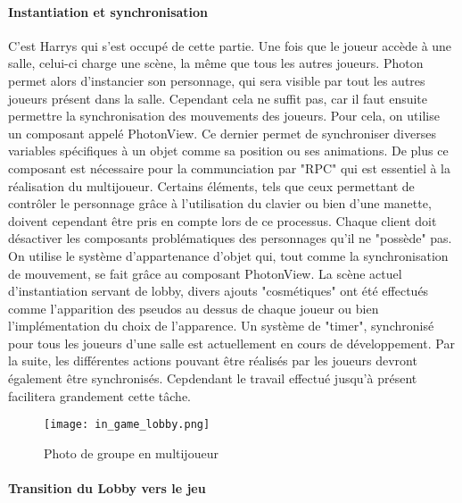         \paragraph{Instantiation et synchronisation}
            C'est Harrys qui s'est occupé de cette partie. Une fois que le joueur accède à une salle,
            celui-ci charge une scène, la même que tous les autres joueurs.
            Photon permet alors d'instancier son personnage, qui sera visible par tout les autres joueurs
            présent dans la salle. Cependant cela ne suffit pas, car il faut ensuite permettre la synchronisation
            des mouvements des joueurs. Pour cela, on utilise un composant appelé PhotonView. Ce dernier permet de
            synchroniser diverses variables spécifiques à un objet comme sa position ou ses animations. 
            De plus ce composant est nécessaire pour la communciation par "RPC" qui est essentiel à la réalisation du multijoueur.
            Certains éléments, tels que ceux permettant de contrôler le personnage grâce à l'utilisation du clavier ou bien d'une manette,
            doivent cependant être pris en compte lors de ce processus.
            Chaque client doit désactiver les composants problématiques des personnages qu'il ne "possède" pas.
            On utilise le système
            d'appartenance d'objet qui, tout comme la synchronisation de mouvement, se fait grâce au composant PhotonView.
            La scène actuel d'instantiation servant de lobby, divers ajouts "cosmétiques" ont été effectués comme l'apparition
            des pseudos au dessus de chaque joueur ou bien l'implémentation du choix de l'apparence.
            Un système de "timer", synchronisé pour tous les joueurs d'une salle est actuellement en cours de développement.
            Par la suite, les différentes actions pouvant être réalisés par les joueurs devront également être synchronisés.
            Cepdendant le travail effectué jusqu'à présent facilitera grandement cette tâche.
            
            \begin{figure}[!hbt]
                    \centering \texttt{[image: in\_game\_lobby.png]} 
                    \caption{Photo de groupe en multijoueur}
                \end{figure}



        \paragraph{Transition du Lobby vers le jeu}
        
